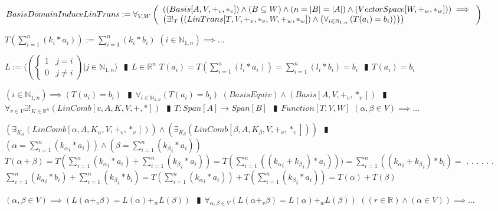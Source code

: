\documentclass{book}
\newcommand{\abr}{:=}
\newcommand{\cont}{\phantom{.}. . .\phantom{.}}
\newcommand{\pipe}{$\phantom{(}\vrectangleblack\phantom{)}$}
\newcommand{\pr}[1]{\left(#1\right)}
\begin{document}
$BasisDomainInduceLinTrans \abr \forall_{V, W}\left(\begin{array}{ll}
  \pr{(Basis[A, V, +_v, *_v]) \land (B \subseteq W) \land (n = |B| = |A|) \land (VectorSpace[W, +_w, *_w])} \hfill \implies \hfill \\
  \pr{\exists!_{T}\pr{(LinTrans[T, V, +_v, *_v, W, +_w, *_w]) \land \pr{\forall_{i \in \mathbb{N}_{1, n}}\pr{T(a_i) = b_i}}}}
\end{array}\right)$
\begin{enumerate}
  \lit $T\pr{\sum_{i = 1}^{n}(k_i * a_i)} \abr \sum_{i = 1}^{n}(k_i * b_i)$
  \lit $(i \in \mathbb{N}_{1, n}) \implies \ldots$
  \begin{enumerate}
    \lit $L \abr \langle \left(\begin{cases} 
      1 & j = i \\
      0 & j \neq i 
    \end{cases}\right) | j \in \mathbb{N}_{1, n} \rangle$ \pipe $L \in \mathbb{R}^n$
    \lit $T(a_i) = T\pr{\sum_{i = 1}^{n}(l_i * a_i)} = \sum_{i = 1}^{n}(l_i * b_i) = b_i$ \pipe $T(a_i) = b_i$
  \end{enumerate}
  \lit $(i \in \mathbb{N}_{1, n}) \implies \pr{T(a_i) = b_i}$ \pipe $\forall_{i \in \mathbb{N}_{1, n}}\pr{T(a_i) = b_i}$
  \lit $(BasisEquiv) \land (Basis[A, V, +_v, *_v])$ \pipe $\forall_{v \in V} \exists!_{K \in \mathbb{R}^n}(LinComb[v, A, K, V, +, *])$ \pipe $T: Span[A] \rightarrow Span[B]$ \pipe $Function[T, V, W]$
  \lit $(\alpha, \beta \in V) \implies \ldots$
  \begin{enumerate}
    \lit $\pr{\exists_{K_\alpha}(LinComb[\alpha, A, K_\alpha, V, +_v, *_v])} \land \pr{\exists_{K_\beta}(LinComb[\beta, A, K_\beta, V, +_v, *_v])}$ \pipe $\pr{\alpha = \sum_{i = 1}^{n}({k_\alpha}_i * a_i)} \land \pr{\beta = \sum_{i = 1}^{n}({k_\beta}_i * a_i)}$
    \lit $T(\alpha + \beta) = T\pr{\sum_{i = 1}^{n}({k_\alpha}_i * a_i) + \sum_{i = 1}^{n}({k_\beta}_i * a_i)} = T\pr{\sum_{i = 1}^{n}\pr{({k_\alpha}_i + {k_\beta}_i) * a_i}}) = \sum_{i = 1}^{n}\pr{({k_\alpha}_i + {k_\beta}_i) * b_i} = $ \cont
    \lit \cont $\sum_{i = 1}^{n}({k_\alpha}_i * b_i) + \sum_{i = 1}^{n}({k_\beta}_i * b_i) = T\pr{\sum_{i = 1}^{n}({k_\alpha}_i * a_i)} + T\pr{\sum_{i = 1}^{n}({k_\beta}_i * a_i)} = T(\alpha) + T(\beta)$
  \end{enumerate}
  \lit $(\alpha, \beta \in V) \implies \pr{L(\alpha +_v \beta) = L(\alpha) +_w L(\beta)}$ \pipe $\forall_{\alpha, \beta \in V}\pr{L(\alpha +_v \beta) = L(\alpha) +_w L(\beta)}$
  \lit $\pr{(r \in \mathbb{R}) \land (\alpha \in V)} \implies \ldots$

\end{enumerate}
\end{document}
